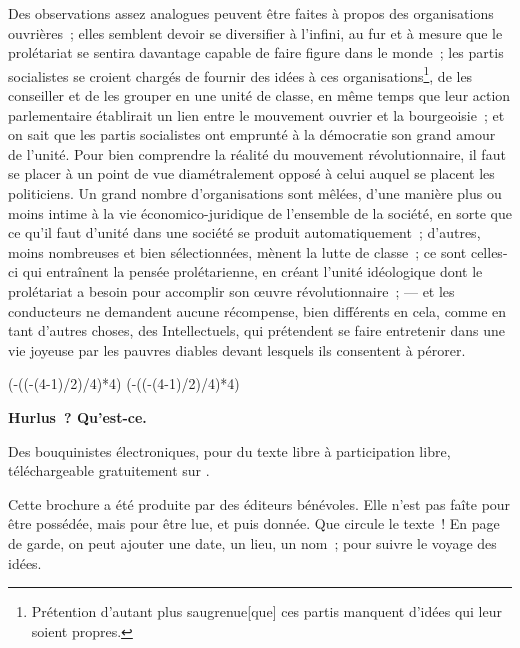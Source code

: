 \documentclass[french,twoside]{book} %
\newcommand\corr[1]{#1}
\def\truncdiv#1#2{((#1-(#2-1)/2)/#2)}
\def\moduloop#1#2{(#1-\truncdiv{#1}{#2}*#2)}
\def\modulo#1#2{\number\numexpr\moduloop{#1}{#2}\relax}
\begin{document}
Des observations assez analogues peuvent être faites à propos des organisations ouvrières ; elles semblent devoir se diversifier à l’infini, au fur et à mesure que le prolétariat se sentira davantage capable de faire figure dans le monde ; les partis socialistes se croient chargés de fournir des idées à ces organisations\footnote{ \noindent Prétention d’autant plus saugrenue[{\corr  que}] ces partis manquent d’idées qui leur soient propres.
 }, de les conseiller et de les grouper en une unité de classe, en même temps que leur action parlementaire établirait un lien entre le mouvement ouvrier et la bourgeoisie ; et on sait que les partis socialistes ont emprunté à la démocratie son grand amour de l’unité. Pour bien comprendre la réalité du mouvement révolutionnaire, il faut se placer à un point de vue diamétralement opposé à celui auquel se placent les politiciens. Un grand nombre d’organisations sont  mêlées, d’une manière plus ou moins intime à la vie économico-juridique de l’ensemble de la société, en sorte que ce qu’il faut d’unité dans une société se produit automatiquement ; d’autres, moins nombreuses et bien sélectionnées, mènent la lutte de classe ; ce sont celles-ci qui entraînent la pensée prolétarienne, en créant l’unité idéologique dont le prolétariat a besoin pour accomplir son œuvre révolutionnaire ; — et les conducteurs ne demandent aucune récompense, bien différents en cela, comme en tant d’autres choses, des Intellectuels, qui prétendent se faire entretenir dans une vie joyeuse par les pauvres diables devant lesquels ils consentent à pérorer.\par
  


\ifbooklet
  \pagestyle{empty}
  \clearpage
  \ifnum\modulo{\value{page}}{4}=0 \hbox{}\newpage\hbox{}\newpage\fi
  \ifnum\modulo{\value{page}}{4}=1 \hbox{}\newpage\hbox{}\newpage\fi


  \hbox{}\newpage
  \ifodd\value{page}\hbox{}\newpage\fi
  {\centering\color{rubric}\bfseries\noindent\large
    Hurlus ? Qu’est-ce.\par
    \bigskip
  }
  \noindent Des bouquinistes électroniques, pour du texte libre à participation libre,
  téléchargeable gratuitement sur \href{https://hurlus.fr}{}.\par
  \bigskip
  \noindent Cette brochure a été produite par des éditeurs bénévoles.
  Elle n’est pas faîte pour être possédée, mais pour être lue, et puis donnée.
  Que circule le texte !
  En page de garde, on peut ajouter une date, un lieu, un nom ; pour suivre le voyage des idées.
  \par
\end{document}
